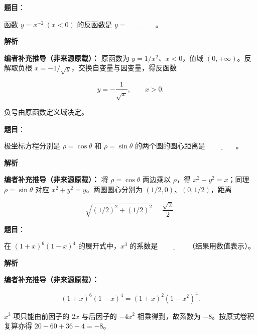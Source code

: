 \begin{answer}

\textbf{题目}：

函数 $y=x^{-2}\ (x<0)$ 的反函数是 $y=\underline{\qquad\qquad}$。

\textbf{解析}

\textbf{编者补充推导（非来源原载）：} 原函数为 $y=1/x^2$、$x<0$，值域 $(0,+\infty)$。反解取负根 $x=-1/\sqrt y$，交换自变量与因变量，得反函数

\nopagebreak[4]
\[y=-\frac1{\sqrt x},\qquad x>0.\]

负号由原函数定义域决定。


\end{answer}
\begin{answer}

\textbf{题目}：

极坐标方程分别是 $\rho=\cos\theta$ 和 $\rho=\sin\theta$ 的两个圆的圆心距离是 $\underline{\qquad\qquad}$。

\textbf{解析}

\textbf{编者补充推导（非来源原载）：} 将 $\rho=\cos\theta$ 两边乘以 $\rho$，得 $x^2+y^2=x$；同理 $\rho=\sin\theta$ 对应 $x^2+y^2=y$。两圆圆心分别为 $(1/2,0)$、$(0,1/2)$，距离

\nopagebreak[4]
\[\sqrt{(1/2)^2+(1/2)^2}=\frac{\sqrt2}{2}.\]


\end{answer}
\begin{answer}

\textbf{题目}：

在 $(1+x)^6(1-x)^4$ 的展开式中，$x^3$ 的系数是 $\underline{\qquad\qquad}$（结果用数值表示）。

\textbf{解析}

\textbf{编者补充推导（非来源原载）：}

\nopagebreak[4]
\[(1+x)^6(1-x)^4=(1+x)^2(1-x^2)^4.\]

$x^3$ 项只能由前因子的 $2x$ 与后因子的 $-4x^2$ 相乘得到，故系数为 $-8$。按原式卷积复算亦得 $20-60+36-4=-8$。


\end{answer}
